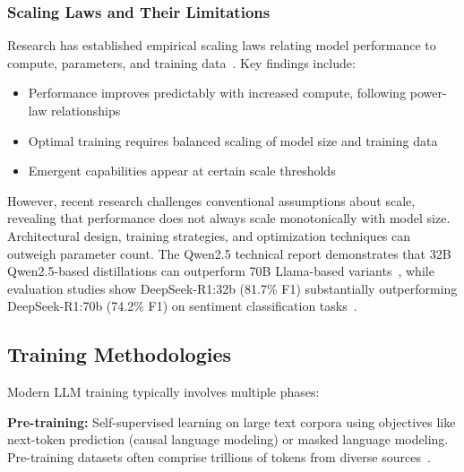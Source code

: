 \subsubsection{Scaling Laws and Their Limitations}

Research has established empirical scaling laws relating model performance to compute, parameters, and training data~\cite{kaplan2020scaling,hoffmann2022chinchilla}. Key findings include:

\begin{itemize}[leftmargin=*]
    \item Performance improves predictably with increased compute, following power-law relationships
    \item Optimal training requires balanced scaling of model size and training data
    \item Emergent capabilities appear at certain scale thresholds
\end{itemize}

However, recent research challenges conventional assumptions about scale, revealing that performance does not always scale monotonically with model size. Architectural design, training strategies, and optimization techniques can outweigh parameter count. The Qwen2.5 technical report demonstrates that 32B Qwen2.5-based distillations can outperform 70B Llama-based variants~\cite{yang2024qwen2.5}, while evaluation studies show DeepSeek-R1:32b (81.7\% F1) substantially outperforming DeepSeek-R1:70b (74.2\% F1) on sentiment classification tasks~\cite{guo2025deepseek}. %

\subsection{Training Methodologies}

Modern LLM training typically involves multiple phases:

\textbf{Pre-training:} Self-supervised learning on large text corpora using objectives like next-token prediction (causal language modeling) or masked language modeling. Pre-training datasets often comprise trillions of tokens from diverse sources~\cite{touvron2023llama}.

